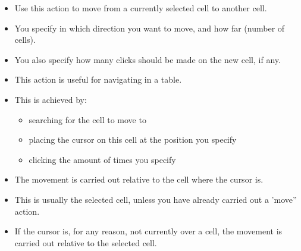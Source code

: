 %
\begin{itemize}
\item Use this action to move from a currently selected cell to another cell.
\item You specify in which direction you want to move, and how far (number of cells).
\item You also specify how many clicks should be made on the new cell, if any.
\item This action is useful for navigating in a table.
\item This is achieved by:
\begin{itemize}
\item searching for the cell to move to
\item placing the cursor on this cell at the position you specify
\item clicking the amount of times you specify
\end{itemize}
\item The movement is carried out relative to the cell where the cursor is. 
\item This is usually the selected cell, unless you have already carried out a 'move'' action. 
\item If the cursor is, for any reason, not currently over a cell, the movement is carried out relative to the selected cell. 
\end{itemize}
